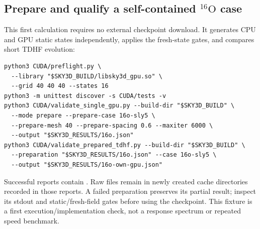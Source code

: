\documentclass[11pt,a4paper]{article}
\newcommand{\Ox}{\texorpdfstring{\ensuremath{^{16}\mathrm{O}}}{16O}}
\newcommand{\code}[1]{\texttt{\detokenize{#1}}}
\begin{document}
\subsection{Prepare and qualify a self-contained \Ox{} case}
This first calculation requires no external checkpoint download. It generates
CPU and GPU static states independently, applies the fresh-state gates, and
compares short TDHF evolution:
\begin{lstlisting}
python3 CUDA/preflight.py \
  --library "$SKY3D_BUILD/libsky3d_gpu.so" \
  --grid 40 40 40 --states 16
python3 -m unittest discover -s CUDA/tests -v
python3 CUDA/validate_single_gpu.py --build-dir "$SKY3D_BUILD" \
  --mode prepare --prepare-case 16o-sly5 \
  --prepare-mesh 40 --prepare-spacing 0.6 --maxiter 6000 \
  --output "$SKY3D_RESULTS/16o.json"
python3 CUDA/validate_prepared_tdhf.py --build-dir "$SKY3D_BUILD" \
  --preparation "$SKY3D_RESULTS/16o.json" --case 16o-sly5 \
  --output "$SKY3D_RESULTS/16o-own-gpu.json"
\end{lstlisting}
Successful reports contain \code{"passed": true}. Raw files remain in newly
created cache directories recorded in those reports. A failed preparation
preserves its partial result; inspect its stdout and static/fresh-field gates
before using the checkpoint. This fixture is a first execution/implementation
check, not a response spectrum or repeated speed benchmark.
\end{document}
